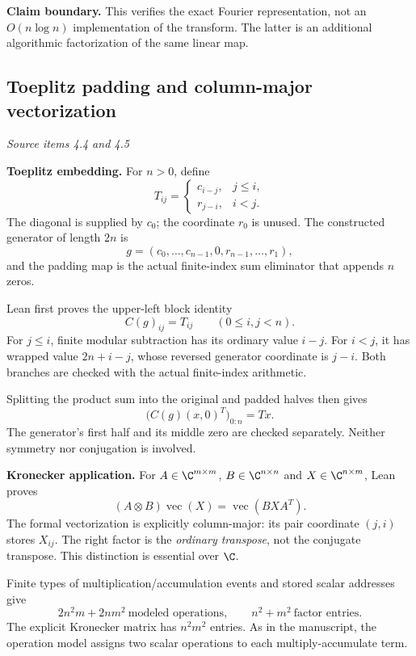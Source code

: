 \textbf{Claim boundary.} This verifies the exact Fourier representation, not an $O(n\log n)$ implementation of the transform. The latter is an additional algorithmic factorization of the same linear map.



\subsection{Toeplitz padding and column-major vectorization}\label{supp4:subsection:002}\textit{Source items 4.4 and 4.5}\par
\textbf{Toeplitz embedding.} For $n>0$, define
\[
T_{ij}=
\begin{cases}
c_{i-j},&j\le i,\\
r_{j-i},&i<j.
\end{cases}
\]
The diagonal is supplied by $c_0$; the coordinate $r_0$ is unused. The constructed generator of length $2n$ is
\[
g=(c_0,\ldots,c_{n-1},0,r_{n-1},\ldots,r_1),
\]
and the padding map is the actual finite-index sum eliminator that appends $n$ zeros.

Lean first proves the upper-left block identity
\[
C(g)_{ij}=T_{ij}\qquad(0\le i,j<n).
\]
For $j\le i$, finite modular subtraction has its ordinary value $i-j$. For $i<j$, it has wrapped value $2n+i-j$, whose reversed generator coordinate is $j-i$. Both branches are checked with the actual finite-index arithmetic.

Splitting the product sum into the original and padded halves then gives
\[
\boxed{\bigl(C(g)(x,0)^T\bigr)_{0:n}=Tx.}
\]
The generator's first half and its middle zero are checked separately. Neither symmetry nor conjugation is involved.

\textbf{Kronecker application.} For $A\in\C^{m\times m}$, $B\in\C^{n\times n}$ and $X\in\C^{n\times m}$, Lean proves
\[
\boxed{(A\otimes B)\operatorname{vec}(X)=\operatorname{vec}(BXA^T).}
\]
The formal vectorization is explicitly column-major: its pair coordinate $(j,i)$ stores $X_{ij}$. The right factor is the \emph{ordinary transpose}, not the conjugate transpose. This distinction is essential over $\C$.

Finite types of multiplication/accumulation events and stored scalar addresses give
\[
\boxed{2n^2m+2nm^2\ \text{modeled operations},\qquad n^2+m^2\ \text{factor entries}.}
\]
The explicit Kronecker matrix has $n^2m^2$ entries. As in the manuscript, the operation model assigns two scalar operations to each multiply-accumulate term.



